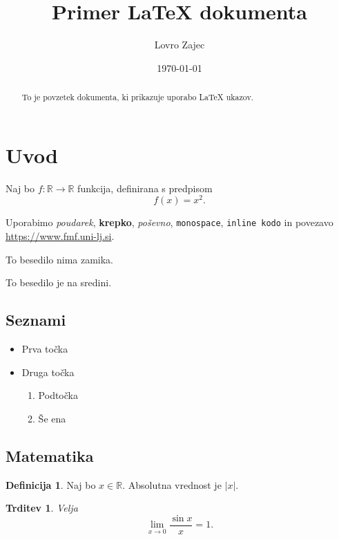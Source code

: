 \documentclass[a4paper,10pt]{article}
\title{Primer LaTeX dokumenta}
\author{Lovro Zajec}
\date{\today}
\newcommand{\R}{\mathbb{R}}
\newcommand{\abs}[1]{\lvert #1 \rvert}
\theoremstyle{definition}
\newtheorem{definicija}{Definicija}
\theoremstyle{plain}
\newtheorem{trditev}{Trditev}
\begin{document}
\maketitle

\begin{abstract}
To je povzetek dokumenta, ki prikazuje uporabo LaTeX ukazov.
\end{abstract}

\tableofcontents

\section{Uvod}
\label{sec:uvod}

Naj bo \( f : \R \to \R \) funkcija, definirana s predpisom
\[
f(x) = x^2.
\]

Uporabimo \emph{poudarek}, \textbf{krepko}, \textit{poševno},
\texttt{monospace}, \verb|inline kodo| in povezavo
\url{https://www.fmf.uni-lj.si}.

\noindent
To besedilo nima zamika.

\begin{center}
To besedilo je na sredini.
\end{center}

\subsection{Seznami}

\begin{itemize}
  \item Prva točka
  \item Druga točka
  \begin{enumerate}
    \item Podtočka
    \item Še ena
  \end{enumerate}
\end{itemize}

\subsection{Matematika}

\begin{definicija}
Naj bo \( x \in \R \). Absolutna vrednost je \( \abs{x} \).
\end{definicija}

\begin{trditev}
Velja
\begin{equation}
\label{eq:limit}
\lim_{x \to 0} \frac{\sin x}{x} = 1.
\end{equation}
\end{trditev}
\end{document}

